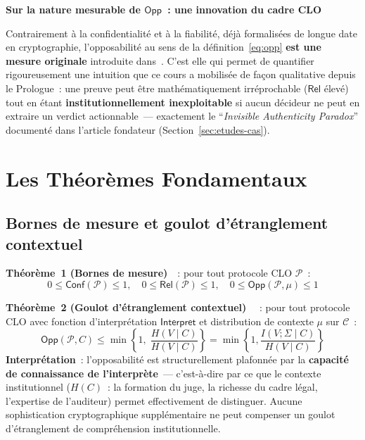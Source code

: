 \begin{boxalert}
\textbf{Sur la nature mesurable de $\mathsf{Opp}$~: une innovation
du cadre CLO}

Contrairement à la confidentialité et à la fiabilité, déjà
formalisées de longue date en cryptographie, l'opposabilité au sens
de la définition~\eqref{eq:opp} \textbf{est une mesure originale}
introduite dans~\cite{minka2026clo}. C'est elle qui permet de
quantifier rigoureusement une intuition que ce cours a mobilisée
de façon qualitative depuis le Prologue~: une preuve peut être
mathématiquement irréprochable ($\mathsf{Rel}$ élevé) tout en étant
\textbf{institutionnellement inexploitable} si aucun décideur ne
peut en extraire un verdict actionnable~--- exactement le
``\textit{Invisible Authenticity Paradox}'' documenté dans
l'article fondateur (Section~\ref{sec:etudes-cas}).
\end{boxalert}

\section{Les Théorèmes Fondamentaux}
\label{sec:theoremes}

\subsection{Bornes de mesure et goulot d'étranglement contextuel}

\begin{boxjuris}
\textbf{Théorème~1 (Bornes de mesure)}~\cite{minka2026clo}~: pour
tout protocole CLO $\mathcal{P}$~:
\begin{equation}
0 \leq \mathsf{Conf}(\mathcal{P}) \leq 1, \quad
0 \leq \mathsf{Rel}(\mathcal{P}) \leq 1, \quad
0 \leq \mathsf{Opp}(\mathcal{P}, \mu) \leq 1
\label{thm:bounds}
\end{equation}
\end{boxjuris}

\begin{boxjuris}
\textbf{Théorème~2 (Goulot d'étranglement contextuel)}~%
\cite{minka2026clo}~: pour tout protocole CLO avec fonction
d'interprétation $\mathsf{Interpret}$ et distribution de contexte
$\mu$ sur $\mathcal{C}$~:
\begin{equation}
\mathsf{Opp}(\mathcal{P}, C) \leq \min\left\{1,\;
\frac{H(V \mid C)}{H(V \mid C)}\right\}
= \min\left\{1, \frac{I(V;\Sigma\mid C)}{H(V\mid C)}\right\}
\label{thm:bottleneck}
\end{equation}
\textbf{Interprétation}~: l'opposabilité est structurellement
plafonnée par la \textbf{capacité de connaissance de
l'interprète}~--- c'est-à-dire par ce que le contexte institutionnel
($H(C)$~: la formation du juge, la richesse du cadre légal,
l'expertise de l'auditeur) permet effectivement de distinguer.
Aucune sophistication cryptographique supplémentaire ne peut
compenser un goulot d'étranglement de compréhension institutionnelle.
\end{boxjuris}

